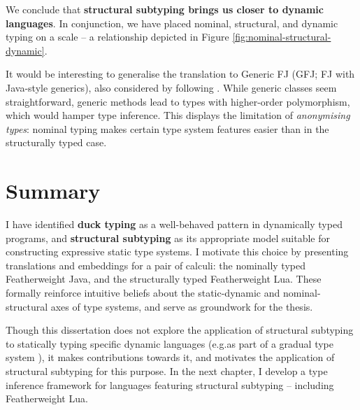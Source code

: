 We conclude that \textbf{structural subtyping brings us closer to dynamic languages}. In conjunction, we have placed nominal, structural, and dynamic typing on a scale -- a relationship depicted in Figure \ref{fig:nominal-structural-dynamic}.

It would be interesting to generalise the translation to Generic FJ (GFJ; FJ with Java-style generics), also considered by \textcite{featherweight-java} following \textcite{generic-java}. While generic classes seem straightforward, generic methods lead to types with higher-order polymorphism, which would hamper type inference. This displays the limitation of \emph{anonymising types}: nominal typing makes certain type system features easier than in the structurally typed case.

\section{Summary}

I have identified \textbf{duck typing} as a well-behaved pattern in dynamically typed programs, and \textbf{structural subtyping} as its appropriate model suitable for constructing expressive static type systems. I motivate this choice by presenting translations and embeddings for a pair of calculi: the nominally typed Featherweight Java, and the structurally typed Featherweight Lua. These formally reinforce intuitive beliefs about the static-dynamic and nominal-structural axes of type systems, and serve as groundwork for the thesis.

Though this dissertation does not explore the application of structural subtyping to statically typing specific dynamic languages (e.g.\@ as part of a gradual type system \cite{gradual-typing-for-objects}), it makes contributions towards it, and motivates the application of structural subtyping for this purpose. In the next chapter, I develop a type inference framework for languages featuring structural subtyping -- including Featherweight Lua.

